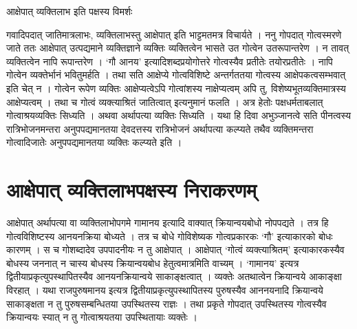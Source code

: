 {आक्षेपात् व्यक्तिलाभ इति पक्षस्य विमर्शः

गवादिपदात् जातिमात्रलाभः, व्यक्तिलाभस्तु आक्षेपात् इति भाट्टमतमत्र विचार्यते । ननु गोपदात् गोत्वस्मरणे जाते ततः आक्षेपात् उत्पद्यमाने व्यक्तिज्ञाने व्यक्तिः व्यक्तित्वेन भासते उत गोत्वेन उतरूपान्तरेण । न तावत् व्यक्तित्वेन नापि रूपान्तरेण । ‘गौ आनय’ इत्यादिशब्दप्रयोगोत्तरे गोत्वस्यैव प्रतीतेः तयोरप्रतीतेः । नापि गोत्वेन व्यक्तेर्भानं भवितुमर्हति । तथा सति आक्षेप्ये गोत्वविशिष्टे अन्तर्गततया गोत्वस्य आक्षेपकत्वसम्भवात् इति चेत् न । गोत्वेन रूपेण व्यक्तिः आक्षेप्यत्वेऽपि गोत्वांशस्य नाक्षेप्यत्वम् अपि तु, विशेष्यभूतव्यक्तिमात्रस्य आक्षेप्यत्वम् । तथा च गोत्वं व्यक्त्याश्रितं जातित्वात् इत्यनुमानं फलति । अत्र हेतोः पक्षधर्मताबलात् गोत्वाश्रयव्यक्तिः सिध्यति । अथवा अर्थापत्या व्यक्तिः सिध्यति । यथा हि दिवा अभुञ्जानत्वे सति पीनत्वस्य रात्रिभोजनमन्तरा अनुपपद्यमानतया देवदत्तस्य रात्रिभोजनं अर्थापत्या कल्प्यते तथैव व्यक्तिमन्तरा गोत्वादिजातेः अनुपपद्यमानतया व्यक्तिः कल्प्यते इति । 

\section*{आक्षेपात् व्यक्तिलाभपक्षस्य निराकरणम्} 

आक्षेपात् अर्थापत्या वा व्यक्तिलाभोपगमे गामानय इत्यादि वाक्यात् क्रियान्वयबोधो नोपपद्यते । तत्र हि गोत्वविशिष्टस्य आनयनक्रिया बोध्यते । तत्र च बोधे गोविशेष्यक गोत्वप्रकारकः ‘गौ’ इत्याकारको बोधः कारणम् । स च गोशब्दादेव उपपादनीयः न तु आक्षेपात् । आक्षेपात् ‘गोत्वं व्यक्त्याश्रितम्’ इत्याकारकस्यैव बोधस्य जननात्  न चास्य बोधस्य क्रियान्वयबोध हेतुत्वमात्रमिति वाच्यम् । ‘गामानय’ इत्यत्र द्वितीयाप्रकृत्युपस्थापितस्यैव आनयनक्रियान्वये साकाङ्क्षत्वात् । व्यक्तेः अतथात्वेन क्रियान्वये आकाङ्क्षा विरहात् । यथा राजपुरुषमानय इत्यत्र द्वितीयाप्रकृत्युपस्थापितस्य पुरुषस्यैव आननयनादि क्रियान्वये साकाङ्क्षता न तु पुरुषसम्बन्धितया उपस्थितस्य राज्ञः । तथा प्रकृते गोपदात् उपस्थितस्य गोत्वस्यैव क्रियान्वयः स्यात् न तु गोत्वाश्रयतया उपस्थितायाः व्यक्तेः ।

\articleend
}

